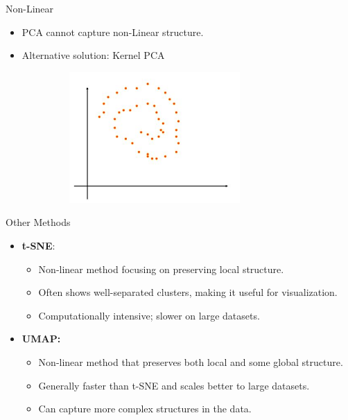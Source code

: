 \documentclass[serif, aspectratio=169]{beamer}
\begin{document}
\begin{frame}{Non-Linear}
    \begin{itemize}
        \item PCA cannot capture non-Linear structure.
        \item Alternative solution: Kernel PCA
        \begin{figure}[htpb]
            \begin{center}
                \includegraphics[width=8cm, height=5cm]{pic/nolinear.JPG}
            \end{center}
        \end{figure}
    \end{itemize}
\end{frame}


\begin{frame}{Other Methods}
    \begin{itemize}
        \item \textbf{t-SNE}:
        \begin{itemize}
            \item Non-linear method focusing on preserving local structure.
            \item Often shows well-separated clusters, making it useful for visualization.
            \item Computationally intensive; slower on large datasets.
        \end{itemize}
        \item \textbf{UMAP:}
        \begin{itemize}
            \item Non-linear method that preserves both local and some global structure.
            \item Generally faster than t-SNE and scales better to large datasets.
            \item Can capture more complex structures in the data.
        \end{itemize}
    \end{itemize}
\end{frame}
\end{document}
